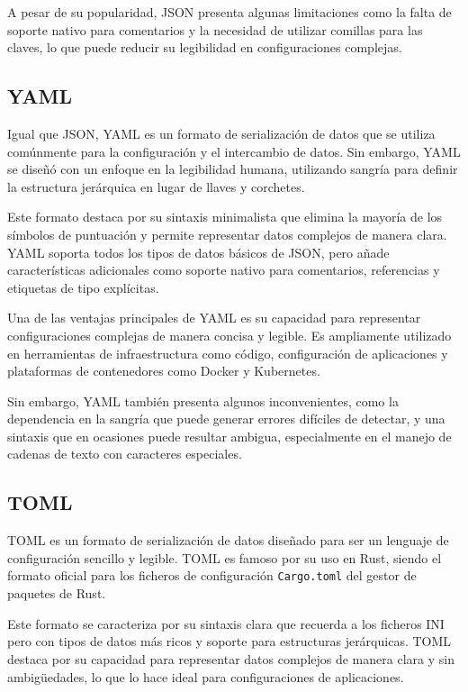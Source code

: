 A pesar de su popularidad, \ac{JSON} presenta algunas limitaciones como la falta de soporte nativo para comentarios y la necesidad de utilizar comillas para las claves, lo que puede reducir su legibilidad en configuraciones complejas.


\subsection{\acs{YAML}}

Igual que \ac{JSON}, \ac{YAML} es un formato de serialización de datos que se utiliza comúnmente para la configuración y el intercambio de datos. Sin embargo, \ac{YAML} se diseñó con un enfoque en la legibilidad humana, utilizando sangría para definir la estructura jerárquica en lugar de llaves y corchetes.

Este formato destaca por su sintaxis minimalista que elimina la mayoría de los símbolos de puntuación y permite representar datos complejos de manera clara. \ac{YAML} soporta todos los tipos de datos básicos de \ac{JSON}, pero añade características adicionales como soporte nativo para comentarios, referencias y etiquetas de tipo explícitas.

Una de las ventajas principales de \ac{YAML} es su capacidad para representar configuraciones complejas de manera concisa y legible. Es ampliamente utilizado en herramientas de infraestructura como código, configuración de aplicaciones y plataformas de contenedores como Docker y Kubernetes.

Sin embargo, \ac{YAML} también presenta algunos inconvenientes, como la dependencia en la sangría que puede generar errores difíciles de detectar, y una sintaxis que en ocasiones puede resultar ambigua, especialmente en el manejo de cadenas de texto con caracteres especiales.


\subsection{\acs{TOML}}

\ac{TOML} es un formato de serialización de datos diseñado para ser un lenguaje de configuración sencillo y legible. \ac{TOML} es famoso por su uso en Rust, siendo el formato oficial para los ficheros de configuración \texttt{Cargo.toml} del gestor de paquetes de Rust.

Este formato se caracteriza por su sintaxis clara que recuerda a los ficheros INI pero con tipos de datos más ricos y soporte para estructuras jerárquicas. \ac{TOML} destaca por su capacidad para representar datos complejos de manera clara y sin ambigüedades, lo que lo hace ideal para configuraciones de aplicaciones.

